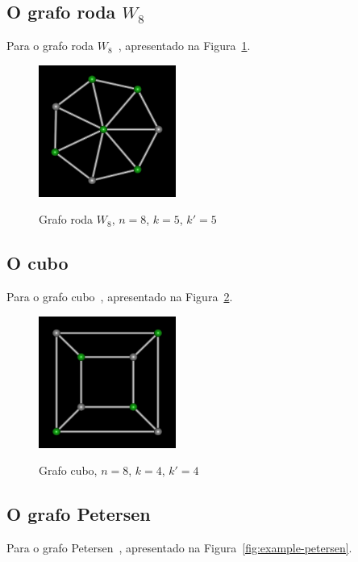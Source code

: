\subsection{O grafo roda $W_8$}
Para o grafo roda $W_8$~\cite{cite:example-bondy},
apresentado na Figura~\ref{fig:example-wheel}.

\begin{figure}[htb]
\centering
\includegraphics[width=0.4\textwidth]{img/wheel.png}
\label{fig:example-wheel}
\caption{Grafo roda $W_8$, $n=8$, $k=5$, $k'=5$}
\end{figure}


\subsection{O cubo}
Para o grafo cubo~\cite{cite:example-plato},
apresentado na Figura~\ref{fig:example-cube}.

\begin{figure}[htb]
\centering
\includegraphics[width=0.4\textwidth]{img/cube.png}
\label{fig:example-cube}
\caption{Grafo cubo, $n=8$, $k=4$, $k'=4$}
\end{figure}


\subsection{O grafo Petersen}
Para o grafo Petersen~\cite{cite:example-petersen},
apresentado na Figura~\ref{fig:example-petersen}.

